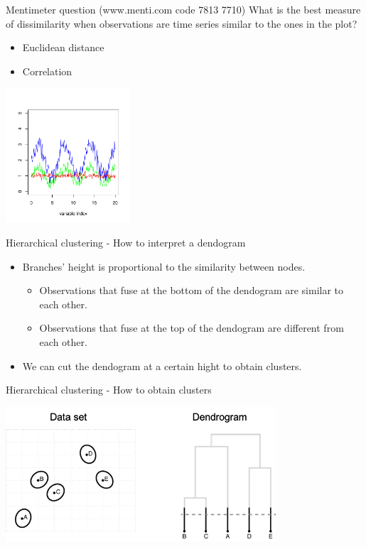 \documentclass[notes]{beamer}          %
\begin{document}
\begin{frame}{Mentimeter question (www.menti.com code 7813 7710)}
What is the best measure of dissimilarity when observations are time series similar to the ones in the plot?
\begin{itemize}
\item Euclidean distance
\item Correlation
\end{itemize}
\begin{center}
\includegraphics[height=5cm]{../figures/week_6/question_metric_hierarchical_clustering.pdf}  
\end{center}
\end{frame}

\begin{frame}{Hierarchical clustering - How to interpret a dendogram}
\begin{itemize}
\item Branches' height is proportional to the similarity between nodes.
\begin{itemize}
\item Observations that fuse at the bottom of the dendogram are similar to each other.
\item Observations that fuse at the top of the dendogram are different from each other.
\end{itemize}
\item We can cut the dendogram at a certain hight to obtain clusters.
\end{itemize}
\end{frame}

\begin{frame}{Hierarchical clustering - How to obtain clusters}
\begin{center}
\includegraphics[height=5cm]{../figures/week_6/HierarchicalClustering_clusters_1.png}  
\end{center}
\end{frame}
\end{document}
